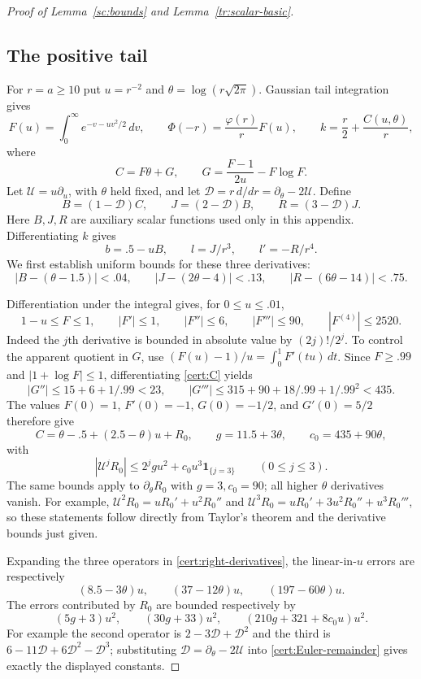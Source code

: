 \begin{proof}[Proof of Lemma~\ref{sc:bounds} and Lemma~\ref{tr:scalar-basic}]
\subsection*{The positive tail}
For $r=a\ge10$ put $u=r^{-2}$ and
$\theta=\log(r\sqrt{2\pi})$. Gaussian tail integration gives
\[
 F(u)=\int_0^\infty e^{-v-uv^2/2}\,dv,\qquad
 \Phi(-r)=\frac{\varphi(r)}r F(u),\qquad
 k=\frac r2+\frac{C(u,\theta)}r,
\]
where
\begin{equation}\label{cert:C}
 C=F\theta+G,\qquad
 G=\frac{F-1}{2u}-F\log F.
\end{equation}
Let $\mathcal U=u\partial_u$, with $\theta$ held fixed, and let
$\mathcal D=r\,d/dr=\partial_\theta-2\mathcal U$. Define
\[
 B=(1-\mathcal D)C,\qquad J=(2-\mathcal D)B,\qquad
 R=(3-\mathcal D)J.
\]
Here $B,J,R$ are auxiliary scalar functions used only in this appendix.
Differentiating $k$ gives
\begin{equation}\label{cert:right-derivatives}
 b=.5-uB,\qquad l=J/r^3,\qquad l'=-R/r^4.
\end{equation}
We first establish uniform bounds for these three derivatives:
\begin{equation}\label{cert:right-errors}
 |B-(\theta-1.5)|<.04,\qquad
 |J-(2\theta-4)|<.13,\qquad
 |R-(6\theta-14)|<.75.
\end{equation}

Differentiation under the integral gives, for $0\le u\le.01$,
\[
 1-u\le F\le1,\qquad |F'|\le1,\qquad
 |F''|\le6,\qquad |F'''|\le90,\qquad |F^{(4)}|\le2520.
\]
Indeed the $j$th derivative is bounded in absolute value by
$(2j)!/2^j$. To control the apparent quotient in $G$, use
$(F(u)-1)/u=\int_0^1F'(tu)\,dt$. Since $F\ge.99$ and
$|1+\log F|\le1$, differentiating \eqref{cert:C} yields
\[
 |G''|\le15+6+1/.99<23,\qquad
 |G'''|\le315+90+18/.99+1/.99^2<435.
\]
The values $F(0)=1$, $F'(0)=-1$, $G(0)=-1/2$, and $G'(0)=5/2$
therefore give
\[
 C=\theta-.5+(2.5-\theta)u+R_0,\qquad
 g=11.5+3\theta,\qquad c_0=435+90\theta,
\]
with
\begin{equation}\label{cert:Euler-remainder}
 |\mathcal U^jR_0|\le2^jg u^2+c_0u^3\mathbf1_{\{j=3\}}
       \qquad(0\le j\le3).
\end{equation}
The same bounds apply to $\partial_\theta R_0$ with $g=3,c_0=90$;
all higher $\theta$ derivatives vanish. For example,
$\mathcal U^2R_0=uR_0'+u^2R_0''$ and
$\mathcal U^3R_0=uR_0'+3u^2R_0''+u^3R_0'''$, so these statements
follow directly from Taylor's theorem and the derivative bounds just given.

Expanding the three operators in \eqref{cert:right-derivatives}, the
linear-in-$u$ errors are respectively
\[
 (8.5-3\theta)u,\qquad (37-12\theta)u,\qquad
 (197-60\theta)u.
\]
The errors contributed by $R_0$ are bounded respectively by
\begin{equation}\label{cert:operator-errors}
 (5g+3)u^2,\qquad(30g+33)u^2,\qquad
 (210g+321+8c_0u)u^2.
\end{equation}
For example the second operator is
$2-3\mathcal D+\mathcal D^2$ and the third is
$6-11\mathcal D+6\mathcal D^2-\mathcal D^3$; substituting
$\mathcal D=\partial_\theta-2\mathcal U$ into
\eqref{cert:Euler-remainder} gives exactly the displayed constants.


\end{proof}
